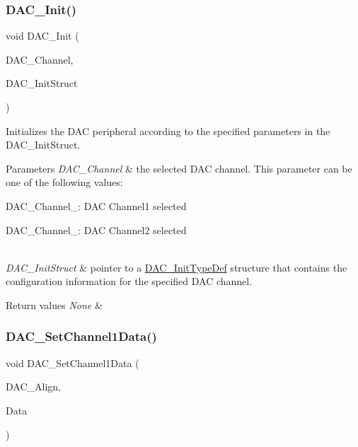 \subsubsection{\texorpdfstring{DAC\_Init()}{DAC\_Init()}}
{\footnotesize\ttfamily void D\+A\+C\+\_\+\+Init (\begin{DoxyParamCaption}\item[{uint32\+\_\+t}]{D\+A\+C\+\_\+\+Channel,  }\item[{\mbox{\hyperlink{struct_d_a_c___init_type_def}{D\+A\+C\+\_\+\+Init\+Type\+Def}} $\ast$}]{D\+A\+C\+\_\+\+Init\+Struct }\end{DoxyParamCaption})}



Initializes the D\+AC peripheral according to the specified parameters in the D\+A\+C\+\_\+\+Init\+Struct. 


\begin{DoxyParams}{Parameters}
{\em D\+A\+C\+\_\+\+Channel} & the selected D\+AC channel. This parameter can be one of the following values\+: \begin{DoxyItemize}
\item D\+A\+C\+\_\+\+Channel\+\_\+: D\+AC Channel1 selected \item D\+A\+C\+\_\+\+Channel\+\_\+: D\+AC Channel2 selected \end{DoxyItemize}
\\
\hline
{\em D\+A\+C\+\_\+\+Init\+Struct} & pointer to a \mbox{\hyperlink{struct_d_a_c___init_type_def}{D\+A\+C\+\_\+\+Init\+Type\+Def}} structure that contains the configuration information for the specified D\+AC channel. \\
\hline
\end{DoxyParams}

\begin{DoxyRetVals}{Return values}
{\em None} & \\
\hline
\end{DoxyRetVals}
\mbox{\label{group___d_a_c___exported___functions_gad06b4230d2b17d1d13f41dce4c782461}} 
\subsubsection{\texorpdfstring{DAC\_SetChannel1Data()}{DAC\_SetChannel1Data()}}
{\footnotesize\ttfamily void D\+A\+C\+\_\+\+Set\+Channel1\+Data (\begin{DoxyParamCaption}\item[{uint32\+\_\+t}]{D\+A\+C\+\_\+\+Align,  }\item[{uint16\+\_\+t}]{Data }\end{DoxyParamCaption})}



